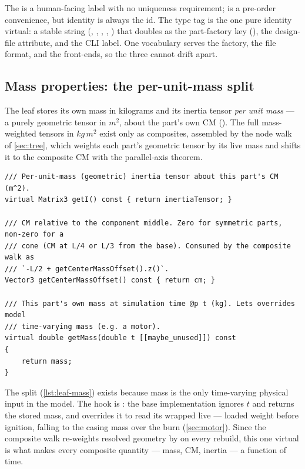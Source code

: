 The  is a human-facing label with no uniqueness requirement;
 is a pre-order convenience, but identity is always the id. The type
tag  is the one pure identity virtual: a stable string
(, , , , )
that doubles as the part-factory key (), the design-file
 attribute, and the CLI  label. One vocabulary serves the
factory, the file format, and the front-ends, so the three cannot drift apart.

\subsection{Mass properties: the per-unit-mass split}\label{sec:leaf-mass}

The leaf stores its own mass in kilograms and its inertia tensor \emph{per unit mass} --- a purely
geometric tensor in $\unit{m^2}$, about the part's own CM (). The full
mass-weighted tensors in $\unit{kg\,m^2}$ exist only as composites, assembled by the node walk of
\cref{sec:tree}, which weights each part's geometric tensor by its live mass and shifts it to the
composite CM with the parallel-axis theorem.

\begin{listing}[htbp]
\begin{verbatim}
/// Per-unit-mass (geometric) inertia tensor about this part's CM (m^2).
virtual Matrix3 getI() const { return inertiaTensor; }

/// CM relative to the component middle. Zero for symmetric parts, non-zero for a
/// cone (CM at L/4 or L/3 from the base). Consumed by the composite walk as
/// `-L/2 + getCenterMassOffset().z()`.
Vector3 getCenterMassOffset() const { return cm; }

/// This part's own mass at simulation time @p t (kg). Lets overrides model
/// time-varying mass (e.g. a motor).
virtual double getMass(double t [[maybe_unused]]) const
{
    return mass;
}
\end{verbatim}
\caption{The mass-property surface of the leaf (--70): a geometric
tensor, a middle-relative CM offset, and a time-parameterized mass.}\label{lst:leaf-mass}
\end{listing}

The split (\cref{lst:leaf-mass}) exists because mass is the only time-varying physical input in the model. The hook is
: the base implementation ignores $t$ and returns the stored mass, and
 overrides it to read its wrapped  live --- loaded weight before
ignition, falling to the casing mass over the burn (\cref{sec:motor}). Since the composite walk
re-weights resolved geometry by  on every rebuild, this one virtual is what makes
every composite quantity --- mass, CM, inertia --- a function of time.

